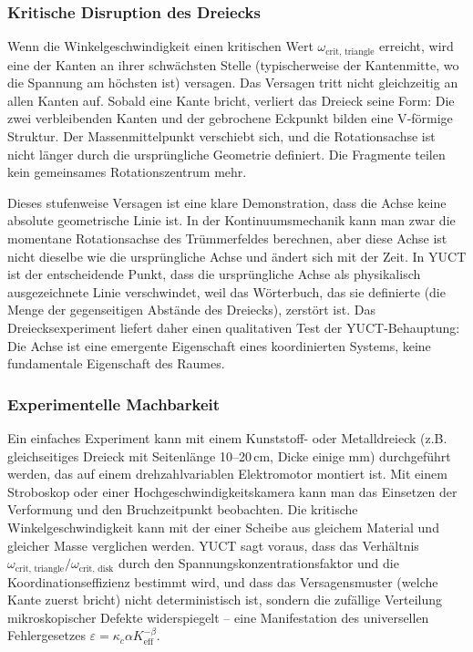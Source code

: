 \documentclass[12pt,a4paper]{article}
\begin{document}
	\subsubsection{Kritische Disruption des Dreiecks}
	
	Wenn die Winkelgeschwindigkeit einen kritischen Wert \(\omega_{\text{crit, triangle}}\) erreicht, wird eine der Kanten an ihrer schwächsten Stelle (typischerweise der Kantenmitte, wo die Spannung am höchsten ist) versagen. Das Versagen tritt nicht gleichzeitig an allen Kanten auf. Sobald eine Kante bricht, verliert das Dreieck seine Form: Die zwei verbleibenden Kanten und der gebrochene Eckpunkt bilden eine V‑förmige Struktur. Der Massenmittelpunkt verschiebt sich, und die Rotationsachse ist nicht länger durch die ursprüngliche Geometrie definiert. Die Fragmente teilen kein gemeinsames Rotationszentrum mehr.
	
	Dieses stufenweise Versagen ist eine klare Demonstration, dass die Achse keine absolute geometrische Linie ist. In der Kontinuumsmechanik kann man zwar die momentane Rotationsachse des Trümmerfeldes berechnen, aber diese Achse ist nicht dieselbe wie die ursprüngliche Achse und ändert sich mit der Zeit. In YUCT ist der entscheidende Punkt, dass die ursprüngliche Achse als physikalisch ausgezeichnete Linie verschwindet, weil das Wörterbuch, das sie definierte (die Menge der gegenseitigen Abstände des Dreiecks), zerstört ist. Das Dreiecksexperiment liefert daher einen qualitativen Test der YUCT-Behauptung: Die Achse ist eine emergente Eigenschaft eines koordinierten Systems, keine fundamentale Eigenschaft des Raumes.
	
	\subsubsection{Experimentelle Machbarkeit}
	
	Ein einfaches Experiment kann mit einem Kunststoff- oder Metalldreieck (z.B. gleichseitiges Dreieck mit Seitenlänge 10–20 cm, Dicke einige mm) durchgeführt werden, das auf einem drehzahlvariablen Elektromotor montiert ist. Mit einem Stroboskop oder einer Hochgeschwindigkeitskamera kann man das Einsetzen der Verformung und den Bruchzeitpunkt beobachten. Die kritische Winkelgeschwindigkeit kann mit der einer Scheibe aus gleichem Material und gleicher Masse verglichen werden. YUCT sagt voraus, dass das Verhältnis \(\omega_{\text{crit, triangle}} / \omega_{\text{crit, disk}}\) durch den Spannungskonzentrationsfaktor und die Koordinationseffizienz bestimmt wird, und dass das Versagensmuster (welche Kante zuerst bricht) nicht deterministisch ist, sondern die zufällige Verteilung mikroskopischer Defekte widerspiegelt – eine Manifestation des universellen Fehlergesetzes \(\varepsilon = \kappa_c \alpha K_{\mathrm{eff}}^{-\beta}\).
	
\end{document}
